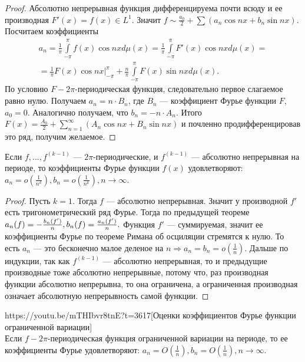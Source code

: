 \begin{proof}
	Абсолютно непрерывная функция дифференцируема почти всюду и ее производная $F'(x)=f(x)\in L^1$. Значит $f\sim\frac{a_0}{2}+\sum\limits(a_n\cos nx+b_n\sin nx)$. Посчитаем коэффициенты 
	\begin{multline*}
		a_n=\frac{1}{\pi}\int\limits_{-\pi}^\pi f(x)\cos nx d\mu(x)=\frac{1}{\pi}\int\limits_{-\pi}^\pi F'(x)\cos nxd\mu(x) =\\=\frac{1}{\pi}F(x)\cos nx|_{-\pi}^\pi+\frac{n}{\pi}\int\limits_{-\pi}^\pi F(x)\sin nxd\mu(x).
	\end{multline*}
По условию $F-2\pi$-периодическая функция, следовательно первое слагаемое равно нулю. Получаем $a_n = n\cdot B_n$, где $B_n$ --- коэффициент Фурье функции $F$, $a_0 = 0$. Аналогично получаем, что $b_n=-n\cdot A_n$. Итого $F(x)=\frac{A_0}{2}+\sum\limits_{n=1}^\infty (A_n\cos nx + B_n\sin nx)$ и почленно продифференцировав это ряд, получим желаемое.
\end{proof}

\begin{corollary}
	Если $f,\ldots,f^{(k-1)}$ --- $2\pi$-периодические, и $f^{(k-1)}$ --- абсолютно непрерывная на периоде, то коэффициенты Фурье функции $f(x)$ удовлетворяют: ${a_n=o(\frac{1}{n^k}), b_n=o(\frac{1}{n^k}), n\to\infty}$.
\end{corollary}

\begin{proof}
	Пусть $k=1$. Тогда $f$ --- абсолютно непрерывная. Значит у производной $f'$ есть тригонометрический ряд Фурье. Тогда по предыдущей теореме $a_n(f)=-\frac{b_n(f')}{n},\\ b_n(f)=\frac{a_n(f')}{n}.$ Функция $f'$ --- суммируемая, значит ее коэффициенты Фурье по теореме Римана об осциляции стремятся к нулю. То есть $a_n$ --- это бесконечно малое деленое на $n\Rightarrow a_n=b_n=o(\frac{1}{n})$. Дальше по индукции, так как $f^{(k-1)}$ --- абсолютно непрерывная, то и предыдущие производные тоже абсолютно непрерывные, потому что, раз производная функции абсолютно непрерывна, то она ограничена, а ограниченная производная означает абсолютную непрерывность самой функции.
\end{proof}

\begin{linkthm}{https://youtu.be/mTHIbvr8tnE?t=3617}[Оценки коэффициентов Фурье функции ограниченной вариации]\ \\
	Если $f-2\pi$-периодическая функция ограниченной вариации на периоде, то ее коэффициенты Фурье удовлетворяют: $a_n=O\left(\frac{1}{n}\right), b_n=O\left(\frac{1}{n}\right), n\to\infty$.
\end{linkthm}

